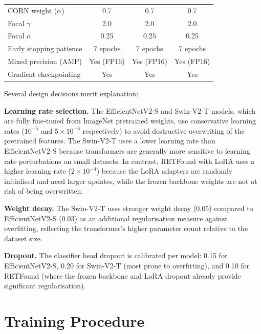 \begin{table}[htbp]
\begin{tabular}{lccc}
\midrule
CORN weight ($\alpha$)  & 0.7                & 0.7                & 0.7               \\
Focal $\gamma$          & 2.0                & 2.0                & 2.0               \\
Focal $\alpha$          & 0.25               & 0.25               & 0.25              \\
\midrule
Early stopping patience & 7 epochs           & 7 epochs           & 7 epochs          \\
Mixed precision (AMP)   & Yes (FP16)         & Yes (FP16)         & Yes (FP16)        \\
Gradient checkpointing  & Yes                & Yes                & Yes               \\
\bottomrule
\end{tabular}
\end{table}

Several design decisions merit explanation:

\textbf{Learning rate selection.} The EfficientNetV2-S and Swin-V2-T models, which are fully fine-tuned from ImageNet pretrained weights, use conservative learning rates ($10^{-5}$ and $5 \times 10^{-6}$ respectively) to avoid destructive overwriting of the pretrained features. The Swin-V2-T uses a lower learning rate than EfficientNetV2-S because transformers are generally more sensitive to learning rate perturbations on small datasets. In contrast, RETFound with LoRA uses a higher learning rate ($2 \times 10^{-4}$) because the LoRA adapters are randomly initialised and need larger updates, while the frozen backbone weights are not at risk of being overwritten.

\textbf{Weight decay.} The Swin-V2-T uses stronger weight decay ($0.05$) compared to EfficientNetV2-S ($0.03$) as an additional regularisation measure against overfitting, reflecting the transformer's higher parameter count relative to the dataset size.

\textbf{Dropout.} The classifier head dropout is calibrated per model: 0.15 for EfficientNetV2-S, 0.20 for Swin-V2-T (most prone to overfitting), and 0.10 for RETFound (where the frozen backbone and LoRA dropout already provide significant regularisation).

\section{Training Procedure}
\label{sec:training_procedure}

